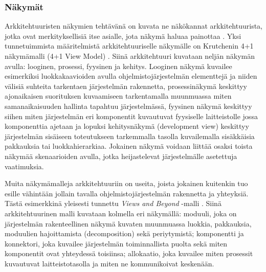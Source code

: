 \documentclass[finnish]{tktltiki2}
\theoremstyle{definition}
\theoremstyle{remark}
\begin{document}
\subsubsection{Näkymät}
Arkkitehtuuristen näkymien tehtävänä on kuvata ne näkökannat arkkitehtuurista, jotka ovat merkityksellisiä itse asialle, jota näkymä haluaa painottaa \citetext{\citealp[s. 34]{Rozanski:2011:SSA:2072649}; \citealp[s. 15]{may2005survey}}. Yksi tunnetuimmista määritelmistä arkkitehtuuriselle näkymälle on Krutchenin 4+1 näkymämalli (4+1 View Model) \citep[s.7-8]{gorton_understanding_2011}. Siinä arkkitehtuuri kuvataan neljän näkymän avulla: looginen, prosessi, fyysinen ja kehitys. Looginen näkymä kuvailee esimerkiksi luokkakaavioiden avulla ohjelmistojärjestelmän elementtejä ja niiden välisiä suhteita tarkentaen järjestelmän rakennetta, prosessinäkymä keskittyy ajonaikaisen suorituksen kuvaamiseen tarkentamalla muunmuassa miten samanaikaisuuden hallinta tapahtuu järjestelmässä, fyysinen näkymä keskittyy siihen miten järjestelmän eri komponentit kuvautuvat fyysiselle laitteistolle jossa komponenttia ajetaan ja lopuksi kehitysnäkymä (development view) keskittyy järjestelmän sisäiseen toteutukseen tarkemmalla tasolla kuvailemalla sisäkkäisia pakkauksia tai luokkahierarkiaa. Jokainen näkymä voidaan liittää osaksi toista näkymää skenaarioiden avulla, jotka heijastelevat järjestelmälle asetettuja vaatimuksia. 

Muita näkymämalleja arkkitehtuuriin on useita, joista jokainen kuitenkin tuo esille vähintään jollain tavalla ohjelmistojärjestelmän rakennetta ja yhteyksiä. Tästä esimerkkinä yleisesti tunnettu \textit{Views and Beyond} -malli \citep[s.8]{gorton_understanding_2011}. Siinä arkkitehtuurinen malli kuvataan kolmella eri näkymällä: moduuli, joka on järjestelmän rakenteellinen näkymä kuvaten muunmuassa luokkia, pakkauksia, moduulien hajoittamista (decomposition) sekä periytymistä; komponentti ja konnektori, joka kuvailee järjestelmän toiminnallista puolta sekä miten komponentit ovat yhteydessä toisiinsa; allokaatio, joka kuvailee miten prosessit kuvautuvat laitteistotasolla  ja miten ne kommunikoivat keskenään. 
\end{document}
